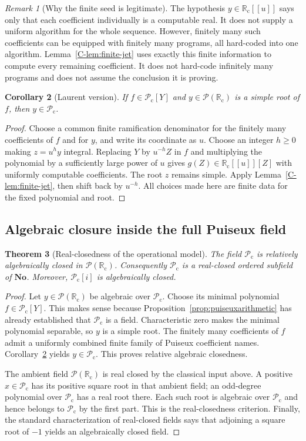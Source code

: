 \documentclass[11pt,letterpaper]{article}
\numberwithin{equation}{section}
\newtheorem{theorem}{Theorem}[section]
\newtheorem{corollary}[theorem]{Corollary}
\theoremstyle{definition}
\theoremstyle{remark}
\newtheorem{remark}[theorem]{Remark}
\newcommand{\PP}{\mathcal P}
\newcommand{\No}{\mathbf{No}}
\newcommand{\Rc}{\mathbb R_{\mathrm c}}
\newcommand{\Pc}{\mathcal P_{\mathrm c}}
\begin{document}
\begin{remark}[Why the finite seed is legitimate]
The hypothesis $y\in\Rc[[u]]$ says only that each coefficient individually
is a computable real. It does not supply a uniform algorithm for the whole
sequence. However, finitely many such coefficients can be equipped with
finitely many programs, all hard-coded into one algorithm. Lemma~\ref{C-lem:finite-jet}
uses exactly this finite information to compute every remaining coefficient.
It does not hard-code infinitely many programs and does not assume the
conclusion it is proving.
\end{remark}

\begin{corollary}[Laurent version]
\label{C-cor:laurent-lift}
If $f\in\Pc[Y]$ and $y\in\PP(\Rc)$ is a simple root of $f$, then
$y\in\Pc$.
\end{corollary}
\begin{proof}
Choose a common finite ramification denominator for the finitely many
coefficients of $f$ and for $y$, and write its coordinate as $u$.
Choose an integer $h\geq0$ making $z=u^hy$ integral. Replacing $Y$ by
$u^{-h}Z$ in $f$ and multiplying the polynomial by a sufficiently large
power of $u$ gives $g(Z)\in\Rc[[u]][Z]$ with uniformly computable
coefficients. The root $z$ remains simple. Apply
Lemma~\ref{C-lem:finite-jet}, then shift back by $u^{-h}$.
All choices made here are finite data for the fixed polynomial and root.
\end{proof}

\subsection{Algebraic closure inside the full Puiseux field}

\begin{theorem}[Real-closedness of the operational model]
\label{C-thm:pc-realclosed}
The field $\Pc$ is relatively algebraically closed in $\PP(\Rc)$.
Consequently $\Pc$ is a real-closed ordered subfield of $\No$.
Moreover, $\Pc[i]$ is algebraically closed.
\end{theorem}
\begin{proof}
Let $y\in\PP(\Rc)$ be algebraic over $\Pc$. Choose its minimal polynomial
$f\in\Pc[Y]$. This makes sense because Proposition~\ref{prop:puiseuxarithmetic} has
already established that $\Pc$ is a field. Characteristic zero makes the
minimal polynomial separable, so $y$ is a simple root. The finitely many
coefficients of $f$ admit a uniformly combined finite family of Puiseux
coefficient names. Corollary~\ref{C-cor:laurent-lift} yields $y\in\Pc$.
This proves relative algebraic closedness.

The ambient field $\PP(\Rc)$ is real closed by the classical input above.
A positive $x\in\Pc$ has its positive square root in that ambient field;
an odd-degree polynomial over $\Pc$ has a real root there. Each such root
is algebraic over $\Pc$ and hence belongs to $\Pc$ by the first part.
This is the real-closedness criterion. Finally, the standard
characterization of real-closed fields says that adjoining a square root
of $-1$ yields an algebraically closed field.
\end{proof}
\end{document}
